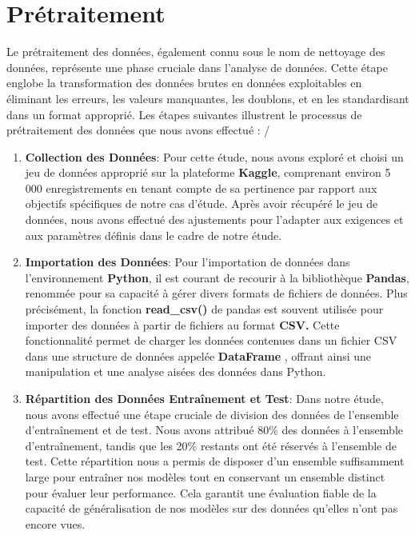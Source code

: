 \section{Prétraitement}
Le prétraitement des données, également connu sous le nom de nettoyage des données, représente une phase cruciale dans l'analyse de données. Cette étape englobe la transformation des données brutes en données exploitables en éliminant les erreurs, les valeurs manquantes, les doublons, et en les standardisant dans un format approprié. Les étapes suivantes illustrent le processus de prétraitement des données que nous avons effectué :
/\begin{enumerate}
    \item \textbf{Collection des Données}: Pour cette étude,  nous avons  exploré et choisi un jeu de données approprié sur la plateforme \textbf{Kaggle}, comprenant environ 5 000 enregistrements en tenant compte de sa pertinence par rapport aux objectifs spécifiques de  notre cas d'étude. Après avoir récupéré le jeu de données, nous avons effectué des ajustements pour l'adapter aux exigences et aux paramètres définis dans le cadre de notre étude.
    \item \textbf{Importation des Données}: Pour l'importation de données dans l'environnement \textbf{Python}, il est courant de recourir à la bibliothèque \textbf{Pandas}, renommée pour sa capacité à gérer divers formats de fichiers de données. Plus précisément, la fonction \textbf{read\_csv()} de pandas est souvent utilisée pour importer des données à partir de fichiers au format \textbf{CSV.} Cette fonctionnalité permet de charger les données contenues dans un fichier CSV dans une structure de données appelée \textbf{DataFrame }, offrant ainsi une manipulation et une analyse aisées des données dans Python.
    \item \textbf{Répartition des Données Entraînement et Test}: Dans notre étude, nous avons effectué une étape cruciale de division des données de l’ensemble d'entraînement et de test. Nous avons attribué 80\% des données à l'ensemble d'entraînement, tandis que les 20\% restants ont été réservés à l'ensemble de test. Cette répartition nous a permis de disposer d'un ensemble suffisamment large pour entraîner nos modèles tout en conservant un ensemble distinct pour évaluer leur performance. Cela garantit une évaluation fiable de la capacité de généralisation de nos modèles sur des données qu'elles n'ont pas encore vues.

\end{enumerate}
